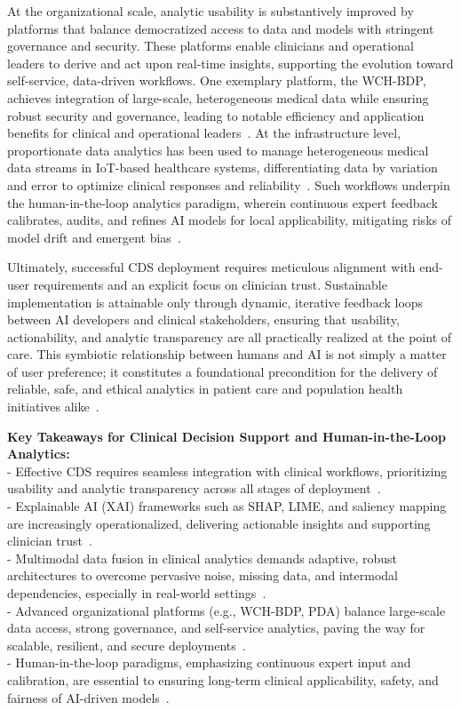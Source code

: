 \documentclass[sigconf]{acmart}
\begin{document}
At the organizational scale, analytic usability is substantively improved by platforms that balance democratized access to data and models with stringent governance and security. These platforms enable clinicians and operational leaders to derive and act upon real-time insights, supporting the evolution toward self-service, data-driven workflows. One exemplary platform, the WCH-BDP, achieves integration of large-scale, heterogeneous medical data while ensuring robust security and governance, leading to notable efficiency and application benefits for clinical and operational leaders~\cite{ref84}. At the infrastructure level, proportionate data analytics has been used to manage heterogeneous medical data streams in IoT-based healthcare systems, differentiating data by variation and error to optimize clinical responses and reliability~\cite{ref106}. Such workflows underpin the human-in-the-loop analytics paradigm, wherein continuous expert feedback calibrates, audits, and refines AI models for local applicability, mitigating risks of model drift and emergent bias~\cite{ref84,ref106}.

Ultimately, successful CDS deployment requires meticulous alignment with end-user requirements and an explicit focus on clinician trust. Sustainable implementation is attainable only through dynamic, iterative feedback loops between AI developers and clinical stakeholders, ensuring that usability, actionability, and analytic transparency are all practically realized at the point of care. This symbiotic relationship between humans and AI is not simply a matter of user preference; it constitutes a foundational precondition for the delivery of reliable, safe, and ethical analytics in patient care and population health initiatives alike~\cite{ref87,ref99,ref106}.

\vspace{0.5em}
\noindent\textbf{Key Takeaways for Clinical Decision Support and Human-in-the-Loop Analytics:}\\
- Effective CDS requires seamless integration with clinical workflows, prioritizing usability and analytic transparency across all stages of deployment~\cite{ref84,ref89}.\\
- Explainable AI (XAI) frameworks such as SHAP, LIME, and saliency mapping are increasingly operationalized, delivering actionable insights and supporting clinician trust~\cite{ref87,ref90,ref99}.\\
- Multimodal data fusion in clinical analytics demands adaptive, robust architectures to overcome pervasive noise, missing data, and intermodal dependencies, especially in real-world settings~\cite{ref78,ref90}.\\
- Advanced organizational platforms (e.g., WCH-BDP, PDA) balance large-scale data access, strong governance, and self-service analytics, paving the way for scalable, resilient, and secure deployments~\cite{ref84,ref106}.\\
- Human-in-the-loop paradigms, emphasizing continuous expert input and calibration, are essential to ensuring long-term clinical applicability, safety, and fairness of AI-driven models~\cite{ref84,ref106}.
\end{document}

